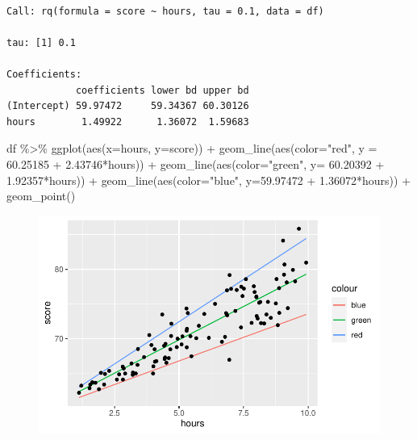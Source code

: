 \documentclass[
  letterpaper,
  DIV=11,
  numbers=noendperiod]{scrreprt}
\newenvironment{Shaded}{\begin{snugshade}}{\end{snugshade}}
\newcommand{\AttributeTok}[1]{\textcolor[rgb]{0.40,0.45,0.13}{#1}}
\newcommand{\FloatTok}[1]{\textcolor[rgb]{0.68,0.00,0.00}{#1}}
\newcommand{\FunctionTok}[1]{\textcolor[rgb]{0.28,0.35,0.67}{#1}}
\newcommand{\NormalTok}[1]{\textcolor[rgb]{0.00,0.23,0.31}{#1}}
\newcommand{\SpecialCharTok}[1]{\textcolor[rgb]{0.37,0.37,0.37}{#1}}
\newcommand{\StringTok}[1]{\textcolor[rgb]{0.13,0.47,0.30}{#1}}
\begin{document}
\begin{verbatim}

Call: rq(formula = score ~ hours, tau = 0.1, data = df)

tau: [1] 0.1

Coefficients:
            coefficients lower bd upper bd
(Intercept) 59.97472     59.34367 60.30126
hours        1.49922      1.36072  1.59683
\end{verbatim}

\begin{Shaded}
\begin{Highlighting}[]
\NormalTok{df }\SpecialCharTok{\%\textgreater{}\%} \FunctionTok{ggplot}\NormalTok{(}\FunctionTok{aes}\NormalTok{(}\AttributeTok{x=}\NormalTok{hours, }\AttributeTok{y=}\NormalTok{score)) }\SpecialCharTok{+}
  \FunctionTok{geom\_line}\NormalTok{(}\FunctionTok{aes}\NormalTok{(}\AttributeTok{color=}\StringTok{"red"}\NormalTok{, }\AttributeTok{y =} \FloatTok{60.25185} \SpecialCharTok{+} \FloatTok{2.43746}\SpecialCharTok{*}\NormalTok{hours)) }\SpecialCharTok{+}
  \FunctionTok{geom\_line}\NormalTok{(}\FunctionTok{aes}\NormalTok{(}\AttributeTok{color=}\StringTok{"green"}\NormalTok{, }\AttributeTok{y=} \FloatTok{60.20392} \SpecialCharTok{+} \FloatTok{1.92357}\SpecialCharTok{*}\NormalTok{hours)) }\SpecialCharTok{+}
  \FunctionTok{geom\_line}\NormalTok{(}\FunctionTok{aes}\NormalTok{(}\AttributeTok{color=}\StringTok{"blue"}\NormalTok{, }\AttributeTok{y=}\FloatTok{59.97472} \SpecialCharTok{+} \FloatTok{1.36072}\SpecialCharTok{*}\NormalTok{hours)) }\SpecialCharTok{+}
  \FunctionTok{geom\_point}\NormalTok{()}
\end{Highlighting}
\end{Shaded}

\begin{figure}[H]

{\centering \includegraphics{methods_files/figure-pdf/unnamed-chunk-6-1.pdf}

}

\end{figure}
\end{document}
